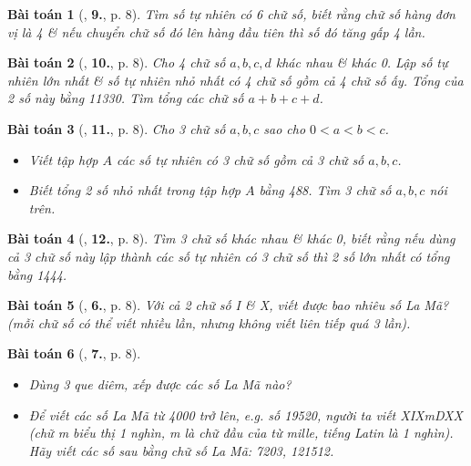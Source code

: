 \documentclass{article}
\numberwithin{equation}{section}
\newtheorem{baitoan}{Bài toán}[section]
\begin{document}
\begin{baitoan}[\cite{Binh_Toan_6_tap_1}, \textbf{9.}, p. 8]
	Tìm số tự nhiên có 6 chữ số, biết rằng chữ số hàng đơn vị là 4 \& nếu chuyển chữ số đó lên hàng đầu tiên thì số đó tăng gấp 4 lần.
\end{baitoan}

\begin{baitoan}[\cite{Binh_Toan_6_tap_1}, \textbf{10.}, p. 8]
	Cho 4 chữ số $a,b,c,d$ khác nhau \& khác 0. Lập số tự nhiên lớn nhất \& số tự nhiên nhỏ nhất có 4 chữ số gồm cả 4 chữ số ấy. Tổng của 2 số này bằng 11330. Tìm tổng các chữ số $a + b + c + d$.
\end{baitoan}

\begin{baitoan}[\cite{Binh_Toan_6_tap_1}, \textbf{11.}, p. 8]
	Cho 3 chữ số $a,b,c$ sao cho $0 < a < b < c$.
	\begin{itemize}
		\item[(a)] Viết tập hợp $A$ các số tự nhiên có 3 chữ số gồm cả 3 chữ số $a,b,c$.
		\item[(b)] Biết tổng 2 số nhỏ nhất trong tập hợp $A$ bằng 488. Tìm 3 chữ số $a,b,c$ nói trên.
	\end{itemize}
\end{baitoan}

\begin{baitoan}[\cite{Binh_Toan_6_tap_1}, \textbf{12.}, p. 8]
	Tìm 3 chữ số khác nhau \& khác 0, biết rằng nếu dùng cả 3 chữ số này lập thành các số tự nhiên có 3 chữ số thì 2 số lớn nhất có tổng bằng 1444.
\end{baitoan}

\begin{baitoan}[\cite{Binh_Toan_6_tap_1}, \textbf{6.}, p. 8]
	Với cả 2 chữ số I \& X, viết được bao nhiêu số La Mã? (mỗi chữ số có thể viết nhiều lần, nhưng không viết liên tiếp quá 3 lần).
\end{baitoan}

\begin{baitoan}[\cite{Binh_Toan_6_tap_1}, \textbf{7.}, p. 8]
	\begin{itemize}
		\item[(a)] Dùng 3 que diêm, xếp được các số La Mã nào?
		\item[(b)] Để viết các số La Mã từ 4000 trở lên, e.g. số 19520, người ta viết XIXmDXX (chữ m biểu thị \emph{1 nghìn}, m là chữ đầu của từ \emph{mille}, tiếng Latin là 1 nghìn). Hãy viết các số sau bằng chữ số La Mã: 7203, 121512.
	\end{itemize}
\end{baitoan}
	
\end{document}
